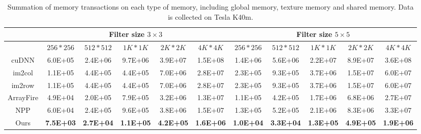 \begin{table}[]
\caption{Summation of memory transactions on each type of memory, including global memory, texture memory and shared memory. Data is collected on Tesla K40m.}
\label{tab:2dmemtrans}
\begin{tabular}{c|ccccc|ccccc}
\hline
\multicolumn{1}{l|}{}                                  & \multicolumn{5}{c|}{Filter size $3 \times 3$}                                                & \multicolumn{5}{c}{Filter size $5 \times 5$}                                                \\ \hline
                                                       & $256 * 256$      & $512 * 512$      & $1K * 1K$        & $2K * 2K$        & $4K * 4K$        & $256 * 256$      & $512 * 512$      & $1K * 1K$        & $2K * 2K$        & $4K * 4K$        \\ \hline
cuDNN                                                  & 6.0E+05          & 2.4E+06          & 9.7E+06          & 3.9E+07          & 1.5E+08          & 1.4E+06          & 5.6E+06          & 2.2E+07          & 8.9E+07          & 3.6E+08          \\
 im2col & 1.1E+05          & 4.4E+05          & 4.4E+05          & 7.0E+06          & 2.8E+07          & 2.3E+05          & 9.3E+05          & 3.7E+06          & 1.5E+07          & 6.0E+07          \\
im2row & 1.1E+05          & 4.4E+05          & 4.4E+05          & 7.0E+06          & 2.8E+07          & 2.3E+05          & 9.3E+05          & 3.7E+06          & 1.5E+07          & 6.0E+07          \\
ArrayFire                                              & 4.9E+04          & 2.0E+05          & 7.9E+05          & 3.2E+06          & 1.3E+07          & 1.1E+05          & 4.2E+05          & 1.7E+06          & 6.8E+06          & 2.7E+07          \\
NPP                                                    & 6.0E+04          & 2.4E+05          & 9.6E+05          & 3.8E+06          & 1.5E+07          & 1.3E+05          & 5.2E+05          & 2.1E+06          & 8.3E+06          & 3.3E+07          \\
Ours                                                   & \textbf{7.5E+03} & \textbf{2.7E+04} & \textbf{1.1E+05} & \textbf{4.2E+05} & \textbf{1.6E+06} & \textbf{1.0E+04} & \textbf{3.3E+04} & \textbf{1.3E+05} & \textbf{4.9E+05} & \textbf{1.9E+06} \\ \hline
\end{tabular}
\end{table}

